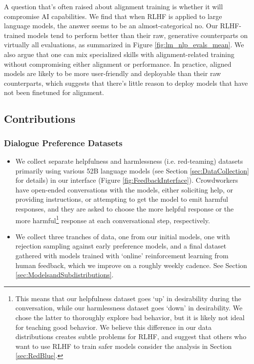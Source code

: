 A question that's often raised about alignment training is whether it will compromise AI capabilities.  We find that when RLHF is applied to large language models, the answer seems to be an almost-categorical no.  Our RLHF-trained models tend to perform better than their raw, generative counterparts on virtually all evaluations, as summarized in Figure \ref{fig:lm_nlp_evals_mean}.  We also argue that one can mix specialized skills with alignment-related training without compromising either alignment or performance.  In practice, aligned models are likely to be more user-friendly and deployable than their raw counterparts, which suggests that there's little reason to deploy models that have not been finetuned for alignment.

\subsection{Contributions}

\subsubsection*{Dialogue Preference Datasets}

\begin{itemize}
    \item We collect separate helpfulness and harmlessness (i.e. red-teaming) datasets primarily using various 52B language models (see Section \ref{sec:DataCollection} for details) in our interface (Figure \ref{fig:FeedbackInterface}).  Crowdworkers have open-ended conversations with the models, either soliciting help, or providing instructions, or attempting to get the model to emit harmful responses, and they are asked to choose the more helpful response or the more harmful\footnote{This means that our helpfulness dataset goes `up' in desirability during the conversation, while our harmlessness dataset goes `down' in desirability.  We chose the latter to thoroughly explore bad behavior, but it is likely not ideal for teaching good behavior. We believe this difference in our data distributions  creates  subtle problems for RLHF, and suggest that others who want to use RLHF to train safer models consider the analysis in Section \ref{sec:RedBlue}.} response at each conversational step, respectively. 
    \item We collect three tranches of data, one from our initial models, one with rejection sampling against early preference models, and a final dataset gathered with models trained with `online' reinforcement learning from human feedback, which we improve on a roughly weekly cadence. See Section \ref{sec:ModelsandSubdistributions}.
\end{itemize}

